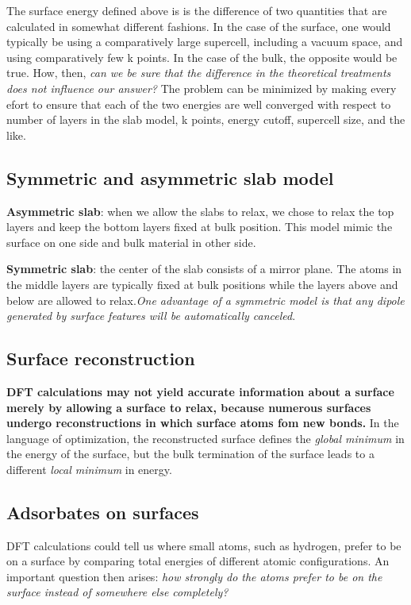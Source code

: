 \documentclass[12pt]{article}
\begin{document}
The surface energy defined above is is the difference of two quantities that are calculated in somewhat different fashions. In the case of the surface, one would typically be using a comparatively large supercell, including a vacuum space, and using comparatively few k points. In the case of the bulk, the opposite would be true. How, then, \emph{can we be sure that the difference in the theoretical treatments does not influence our answer?} The problem can be minimized by making every efort to ensure that each of the two energies are well converged with respect to number of layers in the slab model, k points, energy cutoff, supercell size, and the like.
\subsection{Symmetric and asymmetric slab model}
\textbf{Asymmetric slab}: when we allow the slabs to relax, we chose to relax the top layers and keep the bottom layers fixed at bulk position. This model mimic the surface on one side and bulk material in other side.

\textbf{Symmetric slab}: the center of the slab consists of a mirror plane. The atoms in the middle layers are typically fixed at bulk positions while the layers above and below are allowed to relax.\emph{One advantage of a symmetric model is that any dipole generated by surface features will be automatically canceled}.

\subsection{Surface reconstruction}
\textbf{DFT calculations may not yield accurate information about a surface merely by allowing a surface to relax, because numerous surfaces undergo reconstructions in which surface atoms fom new bonds.} In the language of optimization, the reconstructed surface defines the \emph{global minimum} in the energy of the surface, but the bulk termination of the surface leads to a different \emph{local minimum} in energy.

\subsection{Adsorbates on surfaces}
DFT calculations could tell us where small atoms, such as hydrogen, prefer to be on a surface by comparing total energies of different atomic configurations. An important question then arises: \emph{how strongly do the atoms prefer to be on the surface instead of somewhere else completely?}
\end{document}
